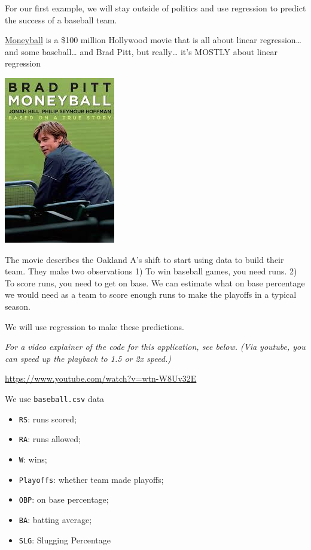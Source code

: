 \documentclass[
  letterpaper,
  DIV=11,
  numbers=noendperiod]{scrreprt}
\providecommand{\tightlist}{%
  \setlength{\itemsep}{0pt}\setlength{\parskip}{0pt}}\usepackage{longtable,booktabs,array}
\begin{document}
For our first example, we will stay outside of politics and use
regression to predict the success of a baseball team.

\href{https://www.youtube.com/watch?v=-4QPVo0UIzc}{Moneyball} is a \$100
million Hollywood movie that is all about linear regression\ldots{} and
some baseball\ldots{} and Brad Pitt, but really\ldots{} it's MOSTLY
about linear regression

\includegraphics{images/moneyball.jpeg}

The movie describes the Oakland A's shift to start using data to build
their team. They make two observations 1) To win baseball games, you
need runs. 2) To score runs, you need to get on base. We can estimate
what on base percentage we would need as a team to score enough runs to
make the playoffs in a typical season.

We will use regression to make these predictions.

\emph{For a video explainer of the code for this application, see below.
(Via youtube, you can speed up the playback to 1.5 or 2x speed.)}

\url{https://www.youtube.com/watch?v=wtn-W8Uv32E}

We use \texttt{baseball.csv} data

\begin{itemize}
\tightlist
\item
  \texttt{RS}: runs scored;
\item
  \texttt{RA}: runs allowed;
\item
  \texttt{W}: wins;
\item
  \texttt{Playoffs}: whether team made playoffs;
\item
  \texttt{OBP}: on base percentage;
\item
  \texttt{BA}: batting average;
\item
  \texttt{SLG}: Slugging Percentage
\end{itemize}
\end{document}
